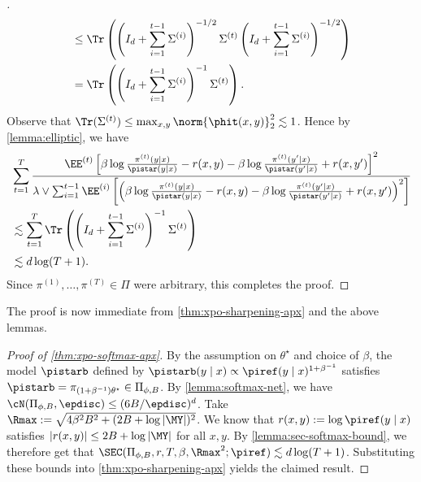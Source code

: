 \begin{proof}[]
\begin{align}
&\leq \Tr \left(\left(I_d + \sum_{i=1}^{t-1}\Sigma^{(i)}\right)^{-1/2} \Sigma^{(t)} \left(I_d + \sum_{i=1}^{t-1}\Sigma^{(i)}\right)^{-1/2}\right) \\ 
&= \Tr\left(\left(I_d + \sum_{i=1}^{t-1}\Sigma^{(i)}\right)^{-1}\Sigma^{(t)}\right).
\end{align}
Observe that $\Tr(\Sigma^{(t)}) \leq \max_{x,y} \norm{\phit(x,y)}_2^2 \lesssim 1$. Hence by \cref{lemma:elliptic}, we have
\begin{align}
&\sum_{t=1}^T\frac{\EE^{(t)}\left[\beta\log\frac{\pi^{(t)}(y\mid x)}{\pistar(y\mid x)} - r(x,y) - \beta\log\frac{\pi^{(t)}(y'\mid x)}{\pistar(y'\mid x)} + r(x,y')\right]^2}{\lambda \lor \sum_{i=1}^{t-1} \EE^{(i)}\left[\left(\beta\log\frac{\pi^{(t)}(y\mid x)}{\pistar(y\mid x)} - r(x,y) - \beta\log\frac{\pi^{(t)}(y'\mid x)}{\pistar(y'\mid x)} + r(x,y')\right)^2\right]} \\ 
&\lesssim \sum_{t=1}^T \Tr\left(\left(I_d + \sum_{i=1}^{t-1}\Sigma^{(i)}\right)^{-1}\Sigma^{(t)}\right) \\ 
&\lesssim d\log(T+1).
\end{align}
Since $\pi^{(1)},\dots,\pi^{(T)} \in \Pi$ were arbitrary, this completes the proof.
\end{proof}

The proof is now immediate from \cref{thm:xpo-sharpening-apx} and the above lemmas.

\begin{proof}[Proof of \cref{thm:xpo-softmax-apx}]
By the assumption on $\theta^\star$ and choice of $\beta$, the model $\pistarb$ defined by $\pistarb(y\mid x) \propto \piref(y\mid x)^{1+\beta^{-1}}$ satisfies $\pistarb = \pi_{(1+\beta^{-1})\theta^\star} \in \Pi_{\phi,B}$. By \cref{lemma:softmax-net}, we have $\cN(\Pi_{\phi,B},\epdisc) \leq (6B/\epdisc)^d$. Take $\Rmax := \sqrt{4\beta^2 B^2 + (2B+\log |\MY|)^2}$. We know that $r(x,y) := \log\piref(y\mid x)$ satisfies $|r(x,y)| \leq 2B+\log|\MY|$ for all $x,y$. By \cref{lemma:sec-softmax-bound}, we therefore get that $\SEC(\Pi_{\phi,B},r,T,\beta,\Rmax^2;\piref) \lesssim d\log(T+1)$. Substituting these bounds into \cref{thm:xpo-sharpening-apx} yields the claimed result.
\end{proof}

